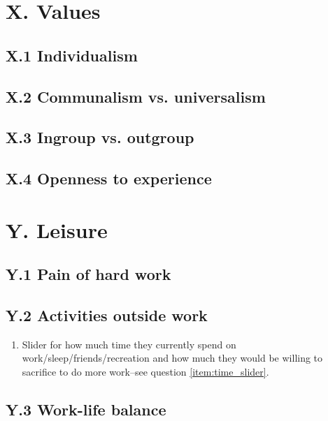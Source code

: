 \documentclass[11pt, headsepline]{article}
\begin{document}

\section*{X. Values}

\subsection*{X.1 Individualism}

\subsection*{X.2 Communalism vs. universalism}

\subsection*{X.3 Ingroup vs. outgroup}

\subsection*{X.4 Openness to experience}

\section*{Y. Leisure}

\subsection*{Y.1 Pain of hard work}

\subsection*{Y.2 Activities outside work}

\begin{enumerate}
    \item Slider for how much time they currently spend on work/sleep/friends/recreation and how much they would be willing to sacrifice to do more work--see question \ref{item:time_slider}.
\end{enumerate}

\subsection*{Y.3 Work-life balance}
\end{document}
